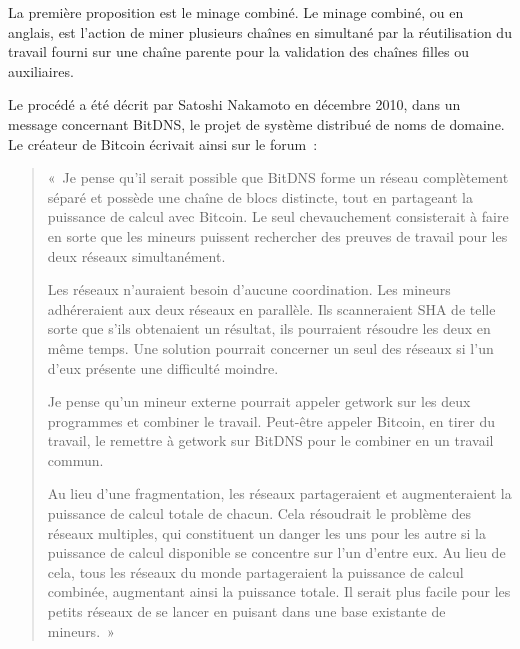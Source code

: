 
La première proposition est le minage combiné. Le minage combiné, ou  en anglais, est l'action de miner plusieurs chaînes en simultané par la réutilisation du travail fourni sur une chaîne parente pour la validation des chaînes filles ou auxiliaires.

Le procédé a été décrit par Satoshi Nakamoto en décembre 2010, dans un message concernant BitDNS, le projet de système distribué de noms de domaine. Le créateur de Bitcoin écrivait ainsi sur le forum~:

\begin{quote}
«~Je pense qu'il serait possible que BitDNS forme un réseau complètement séparé et possède une chaîne de blocs distincte, tout en partageant la puissance de calcul avec Bitcoin. Le seul chevauchement consisterait à faire en sorte que les mineurs puissent rechercher des preuves de travail pour les deux réseaux simultanément.

Les réseaux n'auraient besoin d'aucune coordination. Les mineurs adhéreraient aux deux réseaux en parallèle. Ils scanneraient SHA de telle sorte que s'ils obtenaient un résultat, ils pourraient résoudre les deux en même temps. Une solution pourrait concerner un seul des réseaux si l'un d'eux présente une difficulté moindre.

Je pense qu'un mineur externe pourrait appeler getwork sur les deux programmes et combiner le travail. Peut-être appeler Bitcoin, en tirer du travail, le remettre à getwork sur BitDNS pour le combiner en un travail commun.

Au lieu d'une fragmentation, les réseaux partageraient et augmenteraient la puissance de calcul totale de chacun. Cela résoudrait le problème des réseaux multiples, qui constituent un danger les uns pour les autre si la puissance de calcul disponible se concentre sur l'un d'entre eux. Au lieu de cela, tous les réseaux du monde partageraient la puissance de calcul combinée, augmentant ainsi la puissance totale. Il serait plus facile pour les petits réseaux de se lancer en puisant dans une base existante de mineurs.~»
\end{quote}

